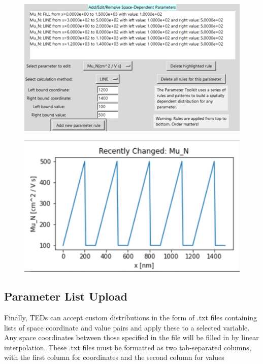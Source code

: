 \documentclass[11pt,letterpaper,titlepage]{article}
\begin{document}
		\begin{figure}[H]
			\label{fig:ptoolkit_mixed}
			\centering
			\includegraphics[scale=1]{"ptoolkit_mixed"}
		\end{figure}
		\begin{figure}[H]
			\label{fig:ptoolkit_mixed_plot}
			\centering
			\includegraphics[scale=1]{"ptoolkit_mixed_plot"}
		\end{figure}
	
		\newpage
		\subsection{Parameter List Upload}
		\par Finally, TEDs can accept custom distributions in the form of .txt files containing lists of space coordinate and value pairs and apply these to a selected variable. Any space coordinates between those specified in the file will be filled in by linear interpolation. These .txt files must be formatted as two tab-separated columns, with the first column for coordinates and the second column for values
		
\end{document}
